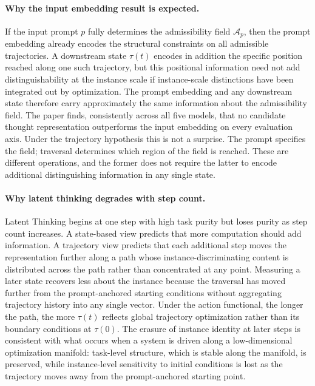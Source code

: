 \documentclass[11pt]{article}
\begin{document}
\paragraph{Why the input embedding result is expected.}
If the input prompt $p$ fully determines the admissibility field $\mathcal{A}_p$, then the
prompt embedding already encodes the structural constraints on all admissible trajectories. A
downstream state $\tau(t)$ encodes in addition the specific position reached along one such
trajectory, but this positional information need not add distinguishability at the instance scale
if instance-scale distinctions have been integrated out by optimization. The prompt embedding and
any downstream state therefore carry approximately the same information about the admissibility
field. The paper finds, consistently across all five models, that no candidate thought
representation outperforms the input embedding on every evaluation axis. Under the trajectory
hypothesis this is not a surprise. The prompt specifies the field; traversal determines which
region of the field is reached. These are different operations, and the former does not require
the latter to encode additional distinguishing information in any single state.

\paragraph{Why latent thinking degrades with step count.}
Latent Thinking begins at one step with high task purity but loses purity as step count
increases. A state-based view predicts that more computation should add information. A trajectory
view predicts that each additional step moves the representation further along a path whose
instance-discriminating content is distributed across the path rather than concentrated at any
point. Measuring a later state recovers less about the instance because the traversal has moved
further from the prompt-anchored starting conditions without aggregating trajectory history into
any single vector. Under the action functional, the longer the path, the more $\tau(t)$ reflects
global trajectory optimization rather than its boundary conditions at $\tau(0)$. The erasure of
instance identity at later steps is consistent with what occurs when a system is driven along a
low-dimensional optimization manifold: task-level structure, which is stable along the manifold,
is preserved, while instance-level sensitivity to initial conditions is lost as the trajectory
moves away from the prompt-anchored starting point.
\end{document}

